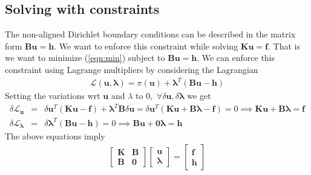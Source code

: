 \documentclass{article}
\newcommand{\ber}{\begin{eqnarray}}
\newcommand{\eer}{\end{eqnarray}}
\newcommand{\nn}{\nonumber}
\begin{document}
\subsection{Solving with constraints}
The non-aligned Dirichlet boundary conditions can be described in the matrix form $\bm{Bu}=\bm{h}$. We want to enforce this constraint while solving $\bm{Ku}=\bm{f}$. That is we want to minimize (\ref{eqn:min}) subject to $\bm{Bu}=\bm{h}$. We can enforce this constraint using Lagrange multipliers by considering the Lagrangian
\ber
\mathcal{L}(\bm{u},\bm{\lambda}) = \pi(\bm{u}) + \bm{\lambda}^{T}(\bm{Bu}-\bm{h})
\eer
Setting the variations wrt $\bm{u}$ and $\lambda$ to $0,\,\,\forall \delta{\bm{u}},\delta{\bm{\lambda}}$ we get
\ber
\delta\mathcal{L}_{\bm{u}}&=&\delta\bm{u}^T(\bm{Ku}-\bm{f}) + \bm{\lambda}^{T}\bm{B}\delta{\bm{u}} = \delta\bm{u}^T(\bm{Ku} + \bm{B}\bm{\lambda}-\bm{f}) = 0 \implies \bm{Ku} + \bm{B}\bm{\lambda}=\bm{f}\nn \\
\delta\mathcal{L}_{\bm{\lambda}} &=& \delta\bm{\lambda}^{T}(\bm{Bu}-\bm{h}) = 0 \implies \bm{Bu}+ \bm{0}\bm{\lambda}=\bm{h}
\eer
The above equations imply
\ber
\begin{bmatrix}
  \bm{K} & \bm{B} \\
  \bm{B} & \bm{0} 
\end{bmatrix}
\begin{bmatrix}
  \bm{u}\\
  \bm{\lambda}
\end{bmatrix}
=
\begin{bmatrix}
  \bm{f}\\
  \bm{h}
\end{bmatrix}
\eer
\end{document}
